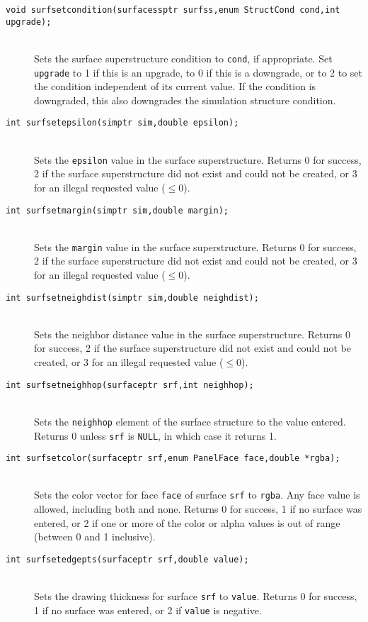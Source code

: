 \documentclass {scrbook}
\newcommand {\ttt} {\texttt}
\begin{document}
\begin{description}
\item[\ttt{void surfsetcondition(surfacessptr surfss,enum StructCond cond,int upgrade);}]
\hfill \\
Sets the surface superstructure condition to \ttt{cond}, if appropriate. Set \ttt{upgrade} to 1 if this is an upgrade, to 0 if this is a downgrade, or to 2 to set the condition independent of its current value. If the condition is downgraded, this also downgrades the simulation structure condition.

\item[\ttt{int surfsetepsilon(simptr sim,double epsilon);}]
\hfill \\
Sets the \ttt{epsilon} value in the surface superstructure. Returns 0 for success, 2 if the surface superstructure did not exist and could not be created, or 3 for an illegal requested value ($\leq 0$).

\item[\ttt{int surfsetmargin(simptr sim,double margin);}]
\hfill \\
Sets the \ttt{margin} value in the surface superstructure. Returns 0 for success, 2 if the surface superstructure did not exist and could not be created, or 3 for an illegal requested value ($\leq 0$).

\item[\ttt{int surfsetneighdist(simptr sim,double neighdist);}]
\hfill \\
Sets the neighbor distance value in the surface superstructure. Returns 0 for success, 2 if the surface superstructure did not exist and could not be created, or 3 for an illegal requested value ($\leq 0$).

\item[\ttt{int surfsetneighhop(surfaceptr srf,int neighhop);}]
\hfill \\
Sets the \ttt{neighhop} element of the surface structure to the value entered. Returns 0 unless \ttt{srf} is \ttt{NULL}, in which case it returns 1.

\item[\ttt{int surfsetcolor(surfaceptr srf,enum PanelFace face,double *rgba);}]
\hfill \\
Sets the color vector for face \ttt{face} of surface \ttt{srf} to \ttt{rgba}. Any face value is allowed, including both and none. Returns 0 for success, 1 if no surface was entered, or 2 if one or more of the color or alpha values is out of range (between 0 and 1 inclusive).

\item[\ttt{int surfsetedgepts(surfaceptr srf,double value);}]
\hfill \\
Sets the drawing thickness for surface \ttt{srf} to \ttt{value}. Returns 0 for success, 1 if no surface was entered, or 2 if \ttt{value} is negative.


\end{description}
\end{document}
